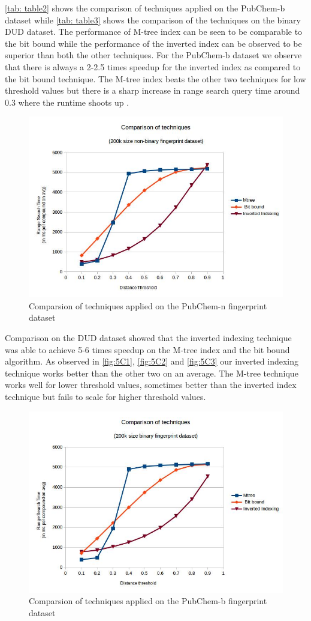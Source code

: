 \autoref{tab: table2} shows the comparison of techniques applied on the PubChem-b dataset while \autoref{tab: table3} shows the comparison of the techniques on the binary DUD dataset. The performance of M-tree index can be seen to be comparable to the bit bound while the performance of the inverted index can be observed to be superior than both the other techniques. For the PubChem-b dataset we observe  that there is always a 2-2.5 times speedup for the inverted index as compared to the bit bound technique. The M-tree index beats the other two techniques for low threshold values but there is a sharp increase in range search query time around 0.3 where the runtime shoots up .


\begin{figure}[ht!]	
\centering
\includegraphics[width=0.75 \columnwidth]{img/imageC1.jpg}
\caption{Comparsion of techniques applied on the PubChem-n fingerprint dataset}
\label{fig:5C1}
\end{figure}


Comparison on the DUD dataset showed that the inverted indexing technique was able to achieve 5-6 times speedup on the M-tree index and the bit bound algorithm. As observed in \autoref{fig:5C1}, \autoref{fig:5C2} and \autoref{fig:5C3} our inverted indexing technique works better than the other two on an average. The M-tree technique works well for lower threshold values, sometimes better than the inverted index technique but fails to scale for higher threshold values. 



\begin{figure}[ht]	
\centering
\includegraphics[width=0.75 \columnwidth]{img/imageC2.jpg}
\caption{Comparsion of techniques applied on the PubChem-b fingerprint dataset}
\label{fig:5C2}
\end{figure}

